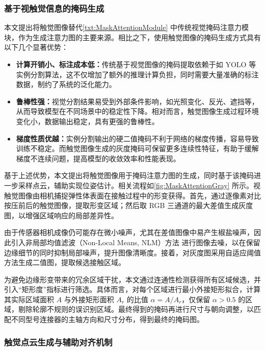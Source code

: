 \documentclass{Diploma}
\begin{document}
\subsubsection{基于视触觉信息的掩码生成}
本文提出将触觉图像替代\ref{txt:MaskAttentionModule} 中传统视觉掩码注意力模块，作为生成注意力图的主要来源。相比之下，使用触觉图像的掩码生成方式具有以下几个显著优势：

\begin{itemize}
  \item  \textbf{计算开销小、标注成本低：}传统基于视觉图像的掩码提取依赖于如 YOLO\cite{redmon2016you} 等实例分割算法，这不仅增加了额外的推理计算负担，同时需要大量准确的标注数据，制约了系统的泛化能力。
    \item \textbf{鲁棒性强：}视觉分割结果易受到外部条件影响，如光照变化、反光、遮挡等，从而导致模型在不同场景中的稳定性下降。相对而言，触觉图像生成过程环境变化小，数据输出稳定，具有更强的鲁棒性。
  \item \textbf{梯度性质优越：}实例分割输出的硬二值掩码不利于网络的梯度传播，容易导致训练不稳定。而触觉图像生成的灰度掩码可保留更多连续性特征，有助于缓解梯度不连续问题，提高模型的收敛效率和性能表现。
\end{itemize}

基于上述优势，本文提出将触觉图像用于掩码注意力图的生成，同时基于该掩码进一步采样点云，辅助实现位姿估计。相关流程如\ref{fig:MaskAttentionGray} 所示。视触觉图像由相机捕捉弹性体表面在接触过程中的形变获得\cite{sun2025tactile}。首先，通过逐像素对比按压前后的触觉图像，提取形变区域；然后取 RGB 三通道的最大差值生成灰度图，以增强区域响应的局部差异性。

%

由于传感器相机成像仍可能存在微小噪声，尤其在差值图像中易产生椒盐噪声，因此引入非局部均值滤波（Non-Local Means, NLM）方法\cite{buades2011non} 进行图像去噪，以在保留边缘细节的同时抑制局部噪声，提升图像清晰度。接着，对灰度图采用自适应阈值方法生成二值图，提取候选接触区域。

为避免边缘形变带来的冗余区域干扰，本文通过连通性检测获得所有区域候选，并引入“矩形度”指标进行筛选。具体而言，对每个区域进行最小外接矩形拟合，计算其实际区域面积 $A$ 与外接矩形面积 $A_r$ 的比值 $\alpha = A / A_r$，仅保留 $\alpha > 0.5$ 的区域，剔除轮廓不规则的误识别区域。最终得到的掩码再进行尺寸与朝向调整，以匹配不同型号连接器的主轴方向和尺寸分布，得到最终的掩码图。

\subsubsection{触觉点云生成与辅助对齐机制}
\end{document}
